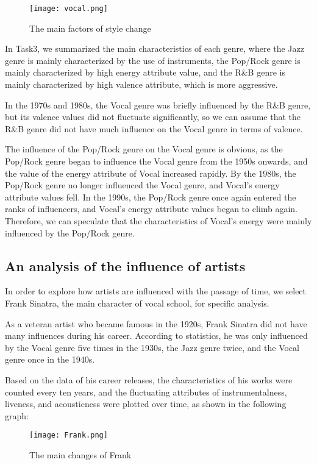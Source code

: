 \documentclass[12pt]{article}  %
\begin{document}
\begin{figure}[H]
    \centering
    \texttt{[image: vocal.png]}
    \caption{The main factors of style change}
    \label{img}
\end{figure}

In Task3, we summarized the main characteristics of each genre, where the Jazz genre is mainly characterized by the use of instruments, the Pop/Rock genre is mainly characterized by high energy attribute value, and the R\&B genre is mainly characterized by high valence attribute, which is more aggressive.

In the 1970s and 1980s, the Vocal genre was briefly influenced by the R\&B genre, but its valence values did not fluctuate significantly, so we can assume that the R\&B genre did not have much influence on the Vocal genre in terms of valence.

The influence of the Pop/Rock genre on the Vocal genre is obvious, as the Pop/Rock genre began to influence the Vocal genre from the 1950s onwards, and the value of the energy attribute of Vocal increased rapidly. By the 1980s, the Pop/Rock genre no longer influenced the Vocal genre, and Vocal's energy attribute values fell. In the 1990s, the Pop/Rock genre once again entered the ranks of influencers, and Vocal's energy attribute values began to climb again. Therefore, we can speculate that the characteristics of Vocal's energy were mainly influenced by the Pop/Rock genre.

\subsection{An analysis of the influence of artists}

In order to explore how artists are influenced with the passage of time, we select Frank Sinatra, the main character of vocal school, for specific analysis.

As a veteran artist who became famous in the 1920s, Frank Sinatra did not have many influences during his career. According to statistics, he was only influenced by the Vocal genre five times in the 1930s, the Jazz genre twice, and the Vocal genre once in the 1940s.

Based on the data of his career releases, the characteristics of his works were counted every ten years, and the fluctuating attributes of instrumentalness, liveness, and acousticness were plotted over time, as shown in the following graph:

\begin{figure}[H]
    \centering
    \texttt{[image: Frank.png]}
    \caption{The main changes of Frank}
    \label{img}
\end{figure}
\end{document}
